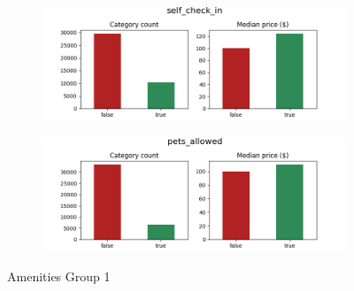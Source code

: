 \begin{figure}[H]
\begin{subfigure}[b]{0.3\textwidth}
    \end{subfigure}
    \hfill
    \begin{subfigure}[b]{0.3\textwidth}
        \centering
        \includegraphics[width=\textwidth]{figures/amenities/group1/self_checkin.png}
    \end{subfigure}
    \begin{subfigure}[b]{0.3\textwidth}
        \centering
        \includegraphics[width=\textwidth]{figures/amenities/group1/pets_allowed.png}
    \end{subfigure}
    \caption{Amenities Group 1}
    \label{fig:amenities-group1}
\end{figure}


